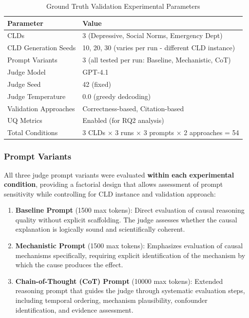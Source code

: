 \documentclass{article}
\begin{document}
\begin{table}[H]
\centering
\caption{Ground Truth Validation Experimental Parameters}
\label{tab:gt_params}
\begin{tabular}{ll}
\toprule
\textbf{Parameter} & \textbf{Value} \\
\midrule
CLDs & 3 (Depressive, Social Norms, Emergency Dept) \\
CLD Generation Seeds & 10, 20, 30 (varies per run - different CLD instance) \\
Prompt Variants & 3 (all tested per run: Baseline, Mechanistic, CoT) \\
Judge Model & GPT-4.1 \\
Judge Seed & 42 (fixed) \\
Judge Temperature & 0.0 (greedy dedcoding) \\
Validation Approaches & Correctness-based, Citation-based \\
UQ Metrics & Enabled (for RQ2 analysis) \\
\midrule
Total Conditions & 3 CLDs $\times$ 3 runs $\times$ 3 prompts $\times$ 2 approaches = 54 \\
\bottomrule
\end{tabular}
\end{table}

\subsubsection{Prompt Variants}

All three judge prompt variants were evaluated \textbf{within each experimental condition}, providing a factorial design that allows assessment of prompt sensitivity while controlling for CLD instance and validation approach:

\begin{enumerate}
    \item \textbf{Baseline Prompt} (1500 max tokens): Direct evaluation of causal reasoning quality without explicit scaffolding. The judge assesses whether the causal explanation is logically sound and scientifically coherent.
    
    \item \textbf{Mechanistic Prompt} (1500 max tokens): Emphasizes evaluation of causal mechanisms specifically, requiring explicit identification of the mechanism by which the cause produces the effect.
    
    \item \textbf{Chain-of-Thought (CoT) Prompt} (10000 max tokens): Extended reasoning prompt that guides the judge through systematic evaluation steps, including temporal ordering, mechanism plausibility, confounder identification, and evidence assessment.
\end{enumerate}
\end{document}
